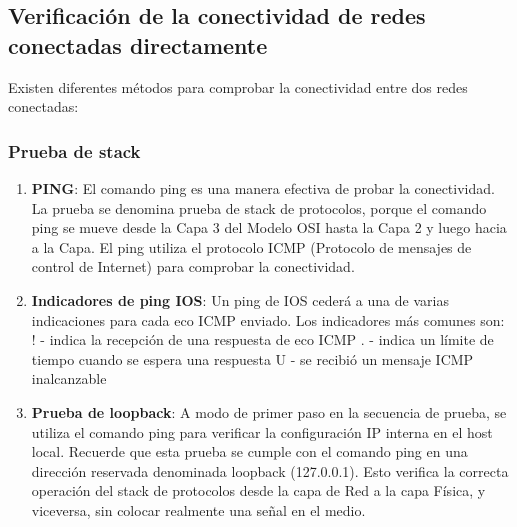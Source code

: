 \documentclass[
	12pt, %
	fleqn, %
	a4paper, %
	oneside, %
]{LegrandOrangeBook}
\begin{document}
\subsection{Verificación de la conectividad de redes conectadas directamente}
Existen diferentes métodos para comprobar la conectividad entre dos redes conectadas:
\subsubsection{Prueba de stack}
\begin{enumerate}
\item \textbf{PING}: El comando ping es una manera efectiva de probar la conectividad. La prueba se denomina prueba de stack de protocolos, porque el comando ping se mueve desde la Capa 3 del Modelo OSI hasta la Capa 2 y luego hacia a la Capa. El ping utiliza el protocolo ICMP (Protocolo de mensajes de control de Internet) para comprobar la conectividad.
\item \textbf{Indicadores de ping IOS}: Un ping de IOS cederá a una de varias indicaciones para cada eco ICMP enviado. Los indicadores más comunes son:
! - indica la recepción de una respuesta de eco ICMP
. - indica un límite de tiempo cuando se espera una respuesta
U - se recibió un mensaje ICMP inalcanzable
\item \textbf{Prueba de loopback}: A modo de primer paso en la secuencia de prueba, se utiliza el comando ping para verificar la configuración IP interna en el host local. Recuerde que esta prueba se cumple con el comando ping en una dirección reservada denominada loopback (127.0.0.1). Esto verifica la correcta operación del stack de protocolos desde la capa de Red a la capa Física, y viceversa, sin colocar realmente una señal en el medio.
\end{enumerate}
\end{document}
